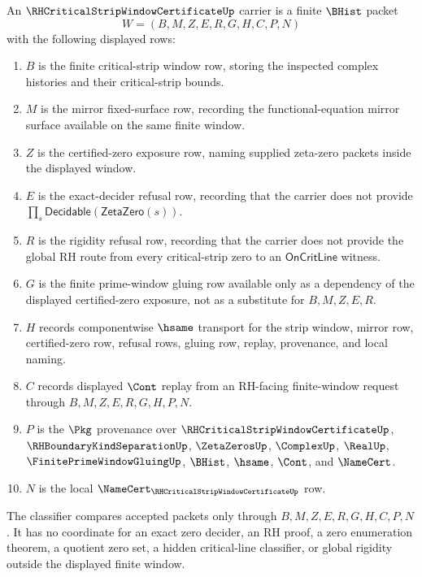 \begin{definition}
\label{def:rh-critical-strip-window-certificate-carrier}
An $\RHCriticalStripWindowCertificateUp$ carrier is a finite $\BHist$ packet
$$
W=(B,M,Z,E,R,G,H,C,P,N)
$$
with the following displayed rows:
\begin{enumerate}
\item $B$ is the finite critical-strip window row, storing the inspected complex histories and their critical-strip bounds.
\item $M$ is the mirror fixed-surface row, recording the functional-equation mirror surface available on the same finite window.
\item $Z$ is the certified-zero exposure row, naming supplied zeta-zero packets inside the displayed window.
\item $E$ is the exact-decider refusal row, recording that the carrier does not provide $\prod_s\mathsf{Decidable}(\mathsf{ZetaZero}(s))$.
\item $R$ is the rigidity refusal row, recording that the carrier does not provide the global RH route from every critical-strip zero to an $\mathsf{OnCritLine}$ witness.
\item $G$ is the finite prime-window gluing row available only as a dependency of the displayed certified-zero exposure, not as a substitute for $B,M,Z,E,R$.
\item $H$ records componentwise $\hsame$ transport for the strip window, mirror row, certified-zero row, refusal rows, gluing row, replay, provenance, and local naming.
\item $C$ records displayed $\Cont$ replay from an RH-facing finite-window request through $B,M,Z,E,R,G,H,P,N$.
\item $P$ is the $\Pkg$ provenance over $\RHCriticalStripWindowCertificateUp$, $\RHBoundaryKindSeparationUp$, $\ZetaZerosUp$, $\ComplexUp$, $\RealUp$, $\FinitePrimeWindowGluingUp$, $\BHist$, $\hsame$, $\Cont$, and $\NameCert$.
\item $N$ is the local $\NameCert_{\RHCriticalStripWindowCertificateUp}$ row.
\end{enumerate}
The classifier compares accepted packets only through $B,M,Z,E,R,G,H,C,P,N$. It has no coordinate for an exact zero decider, an RH proof, a zero enumeration theorem, a quotient zero set, a hidden critical-line classifier, or global rigidity outside the displayed finite window.
\end{definition}

